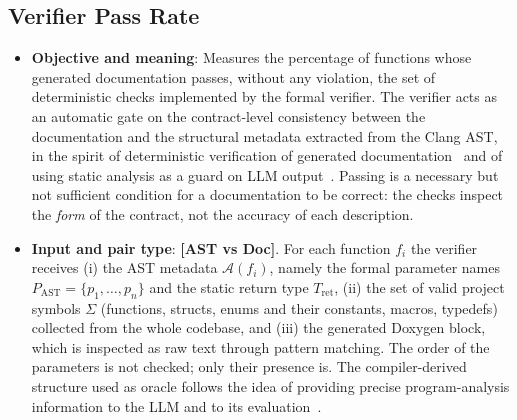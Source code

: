\subsection{Verifier Pass Rate}
\label{sec:m-verifier_pass_rate}
\begin{itemize}[leftmargin=*, label=\textbullet]
	\item \textbf{Objective and meaning}: Measures the percentage of functions whose generated
	documentation passes, without any violation, the set of deterministic checks implemented by the
	formal verifier. The verifier acts as an automatic gate on the contract-level consistency between
	the documentation and the structural metadata extracted from the Clang AST, in the spirit of
	deterministic verification of generated documentation~\cite{yang_docagent_2025} and of using
	static analysis as a guard on LLM output~\cite{pomian_together_2024}. Passing is a necessary but
	not sufficient condition for a documentation to be correct: the checks inspect the
	\emph{form} of the contract, not the accuracy of each description.
	
	\item \textbf{Input and pair type}: \textbf{[AST vs Doc]}. For each function $f_i$ the verifier
	receives (i) the AST metadata $\mathcal{A}(f_i)$, namely the formal parameter names
	$P_{\mathrm{AST}}=\{p_1,\dots,p_n\}$ and the static return type $T_{\mathrm{ret}}$, (ii) the set of
	valid project symbols $\Sigma$ (functions, structs, enums and their constants, macros, typedefs)
	collected from the whole codebase, and (iii) the generated Doxygen block, which is inspected as raw
	text through pattern matching. The order of the parameters is not checked; only their presence is.
	The compiler-derived structure used as oracle follows the idea of providing precise program-analysis
	information to the LLM and to its evaluation~\cite{lomshakov_proconsul_2024}.
	

\end{itemize}
